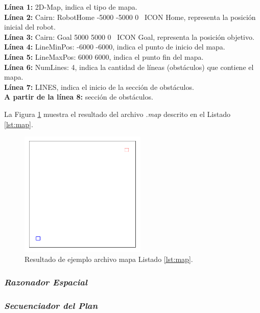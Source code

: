 \documentclass[11pt,twoside,A5]{article}
\newcommand{\reflistings}[1]{Listado \ref{#1}}
\newcommand{\reffigure}[1]{Figura \ref{#1}}
\newcommand{\sourcecode}[2][\footnotesize]{{\ttfamily#1#2}}
\begin{document}
\noindent\textbf{Línea 1:} \sourcecode{2D-Map}, indica el tipo de mapa.
\\\textbf{Línea 2:} \sourcecode{Cairn: RobotHome -5000 -5000 0 \textquotedbl\textquotedbl~ICON \textquotedbl Home\textquotedbl}, representa la posición inicial del robot.
\\\textbf{Línea 3:} \sourcecode{Cairn: Goal 5000 5000 0 \textquotedbl\textquotedbl~ICON \textquotedbl Goal\textquotedbl}, representa la posición objetivo.
\\\textbf{Línea 4:} \sourcecode{LineMinPos: -6000 -6000}, indica el punto de inicio del mapa.
\\\textbf{Línea 5:} \sourcecode{LineMaxPos: 6000 6000}, indica el punto fin del mapa.
\\\textbf{Línea 6:} \sourcecode{NumLines: 4}, indica la cantidad de líneas (obstáculos) que contiene el mapa.
\\\textbf{Línea 7:} \sourcecode{LINES}, indica el inicio de la sección de obstáculos.
\\\textbf{A partir de la línea 8:} sección de obstáculos.

La \reffigure{fig:map} muestra el resultado del archivo \textit{.map} descrito en el \reflistings{lst:map}.

\begin{figure}[here]
\begin{center}
\includegraphics[width=6cm]{map.png} 
\caption{Resultado de ejemplo archivo mapa \reflistings{lst:map}.}
\label{fig:map}
\end{center}
\end{figure} 

\subsubsection*{\textit{Razonador Espacial}}

\subsubsection*{\textit{Secuenciador del Plan}}
\end{document}
